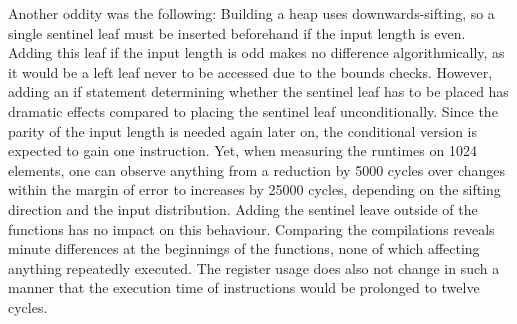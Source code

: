 Another oddity was the following:
Building a heap uses downwards-sifting, so a single sentinel leaf must be inserted beforehand if the input length is even.
Adding this leaf if the input length is odd makes no difference algorithmically, as it would be a left leaf never to be accessed due to the bounds checks.
However, adding an if statement determining whether the sentinel leaf has to be placed has dramatic effects compared to placing the sentinel leaf unconditionally.
Since the parity of the input length is needed again later on, the conditional version is expected to gain one instruction.
Yet, when measuring the runtimes on 1024 elements, one can observe anything from a reduction by \num{5000} cycles over changes within the margin of error to increases by \num{25000} cycles, depending on the sifting direction and the input distribution.
Adding the sentinel leave outside of the \HS{} functions has no impact on this behaviour.
Comparing the compilations reveals minute differences at the beginnings of the \HS{} functions, none of which affecting anything repeatedly executed.
The register usage does also not change in such a manner that the execution time of instructions would be prolonged to twelve cycles.
